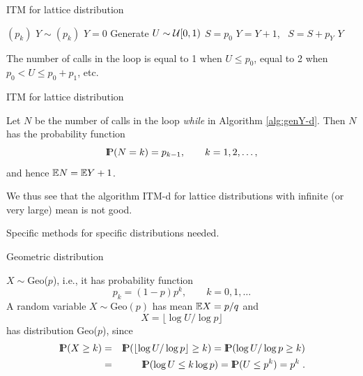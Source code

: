 \documentclass[aspectratio=169]{beamer}
\newcommand{\Prob}{{\rm I\hspace{-0.8mm}P}}
\begin{document}
\begin{frame}{ITM for lattice distribution}
\begin{algorithm}[H]
\caption{ITM-d; generating $Y\sim (p_k)$}
\label{alg:genY-d}
\begin{algorithmic}[1]
\Require $(p_k)$
\Ensure $Y\sim (p_k)$
\State $Y=0$
\State Generate $U\sim {\cal U}[0,1)$
\State $S=p_0$
\State  $Y=Y+1$,   \ $S=S+p_Y$
\EndWhile
\State \Return $Y$
\end{algorithmic}
\end{algorithm}
The number of calls in the loop is equal to 1 when
$U\le  p_0$, equal to 2 when
$p_0<U\le p_0+p_1$, etc.

\end{frame}





\begin{frame}{ITM for lattice distribution}

\begin{myProp}\label{p.l-wywolan}
  Let  $N$ be the number of calls in the loop {\em while} in Algorithm \ref{alg:genY-d}.
 Then $N$ has the probability function
 $$\Prob(N=k)=p_{k-1},\qquad
 k=1,2,\ldots,$$
 and hence
 $\mathbb{E} N=\mathbb{E} Y+1$.
\end{myProp}
We thus see that the algorithm ITM-d for lattice distributions with infinite (or very large) mean  is not good.

Specific methods for specific distributions needed.

\end{frame}




\begin{frame}{Geometric distribution}

$X\sim$Geo($p$), i.e., it has probability function
$$p_k=(1-p)p^k,\qquad k=0,1,\ldots$$
A random variable  $X\sim\mbox{Geo}(p)$ has mean  $\mathbb{E} X =p/q$
and
$$X=\lfloor\log U/\log p\rfloor$$ has distribution  Geo($p$),
since
\begin{eqnarray*}
\Prob(X\ge k)&=&\Prob(\lfloor\log U/\log p\rfloor\ge k) = \Prob(\log U/\log p\ge k)\\
&=&\Prob(\log U\le k\log p)=\Prob(U\le p^k)=p^k\;.
\end{eqnarray*}

\end{frame}
\end{document}
